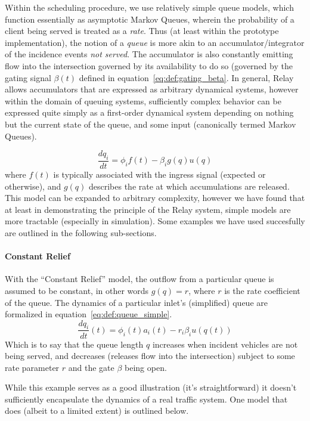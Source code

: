 \documentclass{report}
\begin{document}
Within the scheduling procedure, we use relatively simple queue models, which function essentially as asymptotic Markov Queues, wherein the probability of a client being served is treated as a \emph{rate}.
Thus (at least within the prototype implementation), the notion of a \emph{queue} is more akin to an accumulator/integrator of the incidence events \emph{not served}.
The accumulator is also constantly emitting flow into the intersection governed by its availability to do so (governed by the gating signal $\beta(t)$ defined  in equation~\eqref{eq:def:gating_beta}.
In general, Relay allows accumulators that are expressed as arbitrary dynamical systems, however within the domain of queuing systems, sufficiently complex behavior can be expressed quite simply as a first-order dynamical system depending on nothing but the current state of the queue, and some input (canonically termed Markov Queues).

\begin{equation}\label{eq:def:accumulator_general}
	\frac{dq_i}{dt} = \phi_i f(t) - \beta_i g(q) u(q)
\end{equation}
where $f(t)$ is typically associated with the ingress signal (expected or otherwise), and $g(q)$ describes the rate at which accumulations are released.
This model can be expanded to arbitrary complexity, however we have found that at least in demonstrating the principle of the Relay system, simple models are more tractable (especially in simulation).
Some examples we have used succesfully are outlined in the following sub-sections.

\paragraph{Constant Relief}
With the ``Constant Relief'' model, the outflow from a particular queue is assumed to be constant, in other words $g(q) = r$, where $r$ is the rate coefficient of the queue.
The dynamics of a particular inlet's (simplified) queue are formalized in equation~\eqref{eq:def:queue_simple}.
\begin{equation}\label{eq:def:queue_simple}
	\frac{dq_i}{dt}(t) = \phi_i(t) a_i(t) - r_i \beta_i u(q(t))
\end{equation}
Which is to say that the queue length $q$ increases when incident vehicles are not being served, and decreases (releases flow into the intersection) subject to some rate parameter $r$ and the gate $\beta$ being open.

While this example serves as a good illustration (it's straightforward) it doesn't sufficiently encapsulate the dynamics of a real traffic system.
One model that does (albeit to a limited extent) is outlined below.
\end{document}
